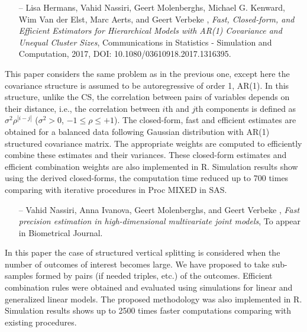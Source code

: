 \documentclass[14pt]{article}
\begin{document}
\begin{itemize}
\item[--]{\textsf{Lisa Hermans, Vahid Nassiri, Geert Molenberghs, Michael G. Kenward, Wim Van der Elst, Marc Aerts, and Geert Verbeke}} , {\it Fast, Closed-form, and Efficient Estimators for Hierarchical Models with AR(1) Covariance and Unequal Cluster Sizes}, Communications in Statistics - Simulation and Computation, 2017, DOI: 10.1080/03610918.2017.1316395.
\end{itemize}
This paper considers the same problem as in the previous one, except here the covariance structure is assumed to be autoregressive of order 1, AR(1). In this structure, unlike the CS, the correlation between pairs of variables depends on their distance, i.e., the correlation between $i$th and $j$th components is defined as $\sigma^2 \rho^{|i-j|}$ ($\sigma^2>0$, $-1\leq\rho\leq +1$). The closed-form, fast and efficient estimates are obtained for a balanced data following Gaussian distribution with AR(1) structured covariance matrix. The appropriate weights are computed to efficiently combine these estimates and their variances. These closed-form estimates and efficient combination weights are also implemented in \textsf{R}. Simulation results show using the derived closed-forms, the computation time reduced up to 700 times comparing with iterative procedures in \textsf{Proc MIXED} in \textsf{SAS}.



\begin{itemize}
\item[--]{\textsf{Vahid Nassiri, Anna Ivanova, Geert Molenberghs, and Geert Verbeke}} , {\it Fast precision estimation in high-dimensional multivariate joint models}, To appear in Biometrical Journal.
\end{itemize}
In this paper the case of structured vertical splitting is considered when the number of outcomes of interest becomes large. We have proposed to take sub-samples formed by pairs (if needed triples, etc.) of the outcomes. Efficient combination rules were obtained and evaluated using simulations for linear and generalized linear models. The proposed methodology was also implemented in \textsf{R}. Simulation results shows up to 2500 times faster computations comparing with existing procedures.
\end{document}
